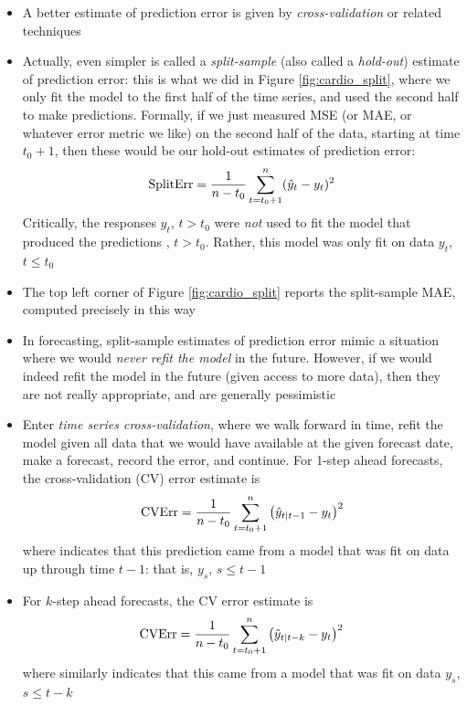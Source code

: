 \documentclass{article}
\begin{document}
\begin{itemize}
\item A better estimate of prediction error is given by \emph{cross-validation}
  or related techniques

\item Actually, even simpler is called a \emph{split-sample} (also called a
  \emph{hold-out}) estimate of prediction error: this is what we did in Figure
  \ref{fig:cardio_split}, where we only fit the model to the first half of the
  time series, and used the second half to make predictions. Formally, if we
  just measured MSE (or MAE, or whatever error metric we like) on the second
  half of the data, starting at time $t_0+1$, then these would be our hold-out
  estimates of prediction error:
  \[
  \mathrm{SplitErr} = \frac{1}{n-t_0} \sum_{t = t_0+1}^n (\hat{y}_t - y_t)^2 
  \]
  Critically, the responses $y_t$, $t > t_0$ were \emph{not} used to fit the
  model that produced the predictions , $t > t_0$. Rather,
  this model was only fit on data $y_t$, $t \leq t_0$

\item The top left corner of Figure \ref{fig:cardio_split} reports the
  split-sample MAE, computed precisely in this way 

\item In forecasting, split-sample estimates of prediction error mimic a
  situation where we would \emph{never refit the model} in the future. However,
  if we would indeed refit the model in the future (given access to more data),
  then they are not really appropriate, and are generally pessimistic

\item Enter \emph{time series cross-validation}, where we walk forward in time,
  refit the model given all data that we would have available at the given
  forecast date, make a forecast, record the error, and continue. For 1-step
  ahead forecasts, the cross-validation (CV) error estimate is
  \[
  \mathrm{CVErr} = \frac{1}{n-t_0} \sum_{t = t_0+1}^n \big( \hat{y}_{t | t-1} - y_t
  \big)^2     
  \]
  where  indicates that this prediction came from a
  model that was fit on data up through time $t-1$: that is, $y_s$, $s \leq t-1$ 

\item For $k$-step ahead forecasts, the CV error estimate is
  \[
  \mathrm{CVErr} = \frac{1}{n-t_0} \sum_{t = t_0+1}^n \big( \hat{y}_{t | t-k} - y_t
  \big)^2     
  \]
  where similarly  indicates that this came from a
  model that was fit on data $y_s$, $s \leq t-k$  


\end{itemize}
\end{document}
